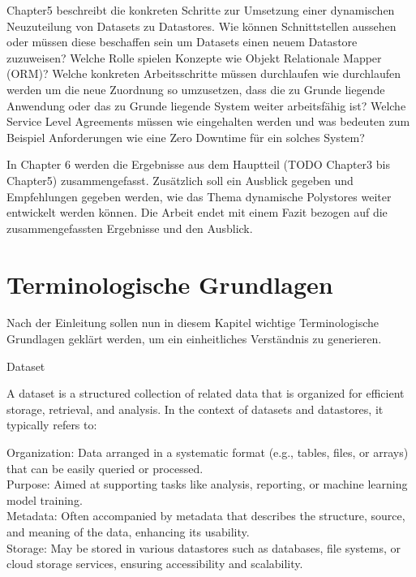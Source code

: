 Chapter5 beschreibt die konkreten Schritte zur Umsetzung einer dynamischen Neuzuteilung von Datasets
zu Datastores. Wie können Schnittstellen aussehen oder müssen diese beschaffen sein um Datasets 
einen neuem Datastore zuzuweisen? Welche Rolle spielen Konzepte wie Objekt Relationale Mapper (ORM)?
Welche konkreten Arbeitsschritte müssen durchlaufen wie durchlaufen werden um die neue Zuordnung
so umzusetzen, dass die zu Grunde liegende Anwendung oder das zu Grunde liegende System weiter 
arbeitsfähig ist? Welche Service Level Agreements müssen wie eingehalten werden und was bedeuten
zum Beispiel Anforderungen wie eine Zero Downtime für ein solches System?

In Chapter 6 werden die Ergebnisse aus dem Hauptteil (TODO Chapter3 bis Chapter5) zusammengefasst.
Zusätzlich soll ein Ausblick gegeben und Empfehlungen gegeben werden, wie das Thema dynamische 
Polystores weiter entwickelt werden können.
Die Arbeit endet mit einem Fazit bezogen auf die zusammengefassten Ergebnisse und den Ausblick.




\chapter{Terminologische Grundlagen}
Nach der Einleitung sollen nun in diesem Kapitel wichtige Terminologische Grundlagen geklärt werden,
um ein einheitliches Verständnis zu generieren.

Dataset

A dataset is a structured collection of related data that is organized for efficient storage, retrieval, and analysis. 
In the context of datasets and datastores, it typically refers to:

Organization: Data arranged in a systematic format (e.g., tables, files, or arrays) that can be easily queried or processed.\newline
\\
Purpose: Aimed at supporting tasks like analysis, reporting, or machine learning model training.\newline
\\
Metadata: Often accompanied by metadata that describes the structure, source, and meaning of the data, enhancing its usability. \newline
\\
Storage: May be stored in various datastores such as databases, file systems, or cloud storage services, ensuring accessibility and scalability.

